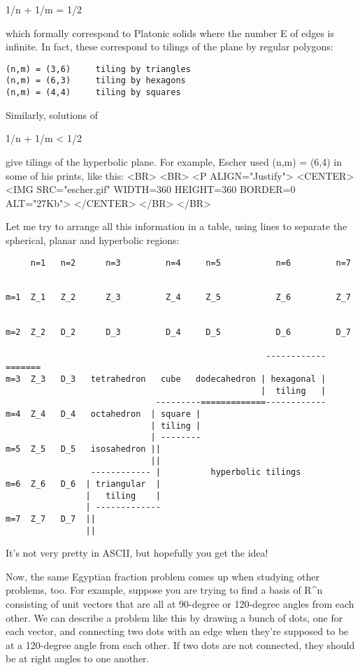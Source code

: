 1/n + 1/m = 1/2

which formally correspond to Platonic solids where the number
E of edges is infinite.  In fact, these correspond to tilings 
of the plane by regular polygons:

\begin{verbatim}
(n,m) = (3,6)     tiling by triangles
(n,m) = (6,3)     tiling by hexagons
(n,m) = (4,4)     tiling by squares
\end{verbatim}
    
Similarly, solutions of

1/n + 1/m < 1/2 

give tilings of the hyperbolic plane.  For example, Escher used
(n,m) = (6,4) in some of his prints, like this:
<BR>
<BR>
<P ALIGN="Justify">
<CENTER>
<IMG SRC="escher.gif" WIDTH=360 HEIGHT=360 BORDER=0 ALT="27Kb">
</CENTER>
</BR>
</BR>

Let me try to arrange all this information in a table, using lines
to separate the spherical, planar and hyperbolic regions:


\begin{verbatim}
     n=1   n=2      n=3         n=4     n=5           n=6         n=7

     
m=1  Z_1   Z_2      Z_3         Z_4     Z_5           Z_6         Z_7

                                                    
m=2  Z_2   D_2      D_3         D_4     D_5           D_6         D_7

                                                    ------------=======
m=3  Z_3   D_3   tetrahedron   cube   dodecahedron | hexagonal |   
                                                   |  tiling   |
                              ---------=============------------
m=4  Z_4   D_4   octahedron  | square |
                             | tiling |
                             | --------
m=5  Z_5   D_5   isosahedron ||
                             ||
                 ------------ |          hyperbolic tilings
m=6  Z_6   D_6  | triangular  |                
                |   tiling    |
                | -------------    
m=7  Z_7   D_7  ||
                ||
\end{verbatim}
    
It's not very pretty in ASCII, but hopefully you get the idea!  

Now, the same Egyptian fraction problem comes up when studying other
problems, too.  For example, suppose you are trying to find a basis of
R^{n} consisting of unit vectors that are all at 90-degree or 120-degree
angles from each other.  We can describe a problem like this by drawing
a bunch of dots, one for each vector, and connecting two dots with an
edge when they're supposed to be at a 120-degree angle from each other. 
If two dots are not connected, they should be at right angles to one
another.  

